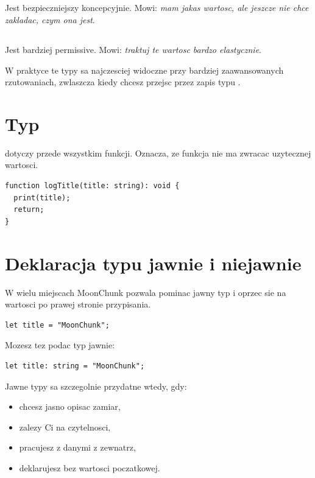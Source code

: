 \subsection*{}
Jest bezpieczniejszy koncepcyjnie. Mowi: \emph{mam jakas wartosc, ale jeszcze nie chce
zakladac, czym ona jest}.

\subsection*{}
Jest bardziej permissive. Mowi: \emph{traktuj te wartosc bardzo elastycznie}.

W praktyce te typy sa najczesciej widoczne przy bardziej zaawansowanych rzutowaniach,
zwlaszcza kiedy chcesz przejsc przez zapis typu .

\section{Typ }
 dotyczy przede wszystkim funkcji. Oznacza, ze funkcja nie ma zwracac
uzytecznej wartosci.

\begin{lstlisting}[style=moonchunk,caption={Funkcja bez wartosci zwrotnej}]
function logTitle(title: string): void {
  print(title);
  return;
}
\end{lstlisting}

\section{Deklaracja typu jawnie i niejawnie}
W wielu miejscach MoonChunk pozwala pominac jawny typ i oprzec sie na wartosci po prawej
stronie przypisania.

\begin{lstlisting}[style=moonchunk,caption={Deklaracja z typem niejawnym}]
let title = "MoonChunk";
\end{lstlisting}

Mozesz tez podac typ jawnie:

\begin{lstlisting}[style=moonchunk,caption={Deklaracja z typem jawnym}]
let title: string = "MoonChunk";
\end{lstlisting}

Jawne typy sa szczegolnie przydatne wtedy, gdy:

\begin{itemize}
  \item chcesz jasno opisac zamiar,
  \item zalezy Ci na czytelnosci,
  \item pracujesz z danymi z zewnatrz,
  \item deklarujesz  bez wartosci poczatkowej.
\end{itemize}

